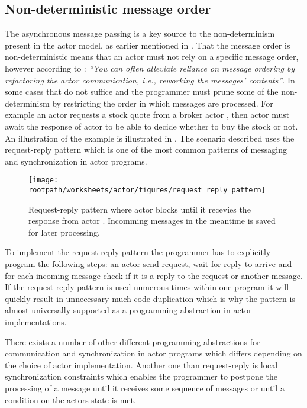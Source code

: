 \subsection{Non-deterministic message order}\label{ssec:nondeter_msg_order}
The asynchronous message passing is a key source to the non-determinism present in the actor model, as earlier mentioned in . That the message order is non-deterministic means that an actor must not rely on a specific message order, however according to \cite[p. 35]{haller2012actors}: \textit{``You can often alleviate reliance on message ordering by refactoring the actor communication, i.e., reworking the messages' contents''}. In some cases that do not suffice and the programmer must prune some of the non-determinism by restricting the order in which messages are processed. For example an actor  requests a stock quote from a broker actor , then actor  must await the response of actor  to be able to decide whether to buy the stock or not. An illustration of the example is illustrated in . The scenario described uses the request-reply pattern which is one of the most common patterns of messaging and synchronization in actor programs\cite[p. 5]{karmani2009actor}.

\begin{figure}[h!]
\centering
\texttt{[image: \\rootpath/worksheets/actor/figures/request\_reply\_pattern]}
\caption{Request-reply pattern where actor  blocks until it recevies the response from actor . Incomming messages in the meantime is saved for later processing.}\label{fig:request_reply_pattern}
\end{figure}

To implement the request-reply pattern the programmer has to explicitly program the following steps: an actor send request, wait for reply to arrive and for each incoming message check if it is a reply to the request or another message. If the request-reply pattern is used numerous times within one program it will quickly result in unnecessary much code duplication which is why the pattern is almost universally supported as a programming abstraction in actor implementations\cite[p. 5]{karmani2009actor}.

There exists a number of other different programming abstractions for communication and synchronization in actor programs which differs depending on the choice of actor implementation\cite[p. 6]{karmani2009actor}. Another one than request-reply is local synchronization constraints which enables the programmer to postpone the processing of a message until it receives some sequence of messages or until a condition on the actors state is met.

